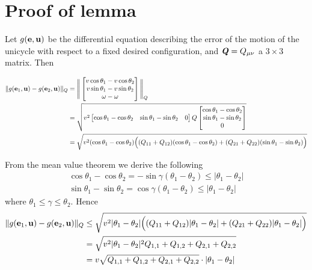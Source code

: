\section{Proof of lemma }

Let $g(\bm{\mathbf{e}}, \bm{\mathbf{u}})$ be the differential equation describing the
error of the motion of the unicycle with respect to a fixed desired
configuration, and $\bm{\mathit{Q}} = Q_{\mu\nu}$ a $3 \times 3$ matrix. Then

\begin{align}
  \|g(\bm{\mathbf{e}}_1, \bm{\mathbf{u}}) - g(\bm{\mathbf{e}}_2, \bm{\mathbf{u}})\|_{Q} &=
  \Bigg\|
  \begin{bmatrix}
    v \cos\theta_1 - v \cos\theta_2 \\
    v \sin\theta_1 - v \sin\theta_2 \\
    \omega - \omega
  \end{bmatrix}
  \Bigg\|_Q \\
  &=\sqrt{v^2
   \begin{bmatrix}
     \cos\theta_1 - \cos\theta_2 & \sin\theta_1 - \sin\theta_2 & 0
   \end{bmatrix}
   Q
   \begin{bmatrix}
     \cos\theta_1 - \cos\theta_2 \\
     \sin\theta_1 - \sin\theta_2 \\
     0
   \end{bmatrix}
  }\\
  &= \sqrt{v^2 (\cos\theta_1 - \cos\theta_2)\Big( (Q_{11}+Q_{12})(\cos\theta_1 - \cos\theta_2) +
                    (Q_{21}+Q_{22})(\sin\theta_1 - \sin\theta_2)\Big)}
\end{align}

From the mean value theorem we derive the following
\begin{align}
  \cos\theta_1 - \cos\theta_2 = -\sin\gamma (\theta_1 - \theta_2) \leq |\theta_1 - \theta_2| \\
  \sin\theta_1 - \sin\theta_2 = \cos\gamma (\theta_1 - \theta_2) \leq |\theta_1 - \theta_2|
\end{align}
where $\theta_1 \leq \gamma \leq \theta_2$. Hence
\begin{align}
  \|g(\bm{\mathbf{e}}_1, \bm{\mathbf{u}}) - g(\bm{\mathbf{e}}_2, \bm{\mathbf{u}})\|_{Q} &\leq
    \sqrt{v^2 |\theta_1 - \theta_2|
      \Big( (Q_{11}+Q_{12}) |\theta_1 - \theta_2|+ (Q_{21}+Q_{22}) |\theta_1 - \theta_2|\Big)} \\
      &= \sqrt{v^2 |\theta_1 - \theta_2|^2 Q_{1,1}+Q_{1,2}+Q_{2,1}+Q_{2,2}} \\
      &= v \sqrt{Q_{1,1}+Q_{1,2}+Q_{2,1}+Q_{2,2}} \cdot |\theta_1 - \theta_2|
\end{align}
